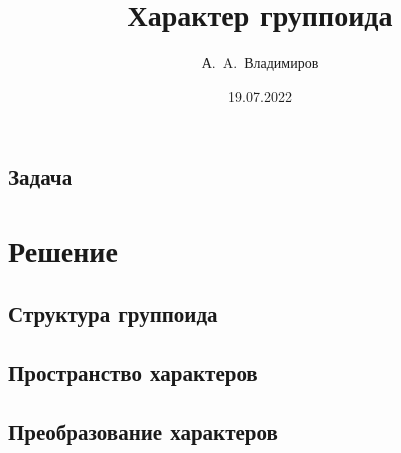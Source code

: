 \documentclass[11pt]{article}
\title{Характер группоида}
\author{А.~A.~Владимиров}
\date{19.07.2022}
\theoremstyle{plain}
\theoremstyle{definition}
\theoremstyle{remark}
\begin{document}
\begin{titlepage}
    \maketitle

\section*{Задача}

\tableofcontents
\end{titlepage}

\section*{Решение}
            \subsection{Структура группоида}
            

\newpage    \subsection{Пространство характеров}
            
            
            
            

\newpage    \subsection{Преобразование характеров}
            
            
            
\end{document}
